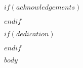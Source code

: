 \documentclass[oneside,11pt,a4paper] {report}
\begin{document}
$if(acknowledgements)$
  \renewcommand{\abstractname}{Acknowledgements}
  \ifdigital
  \fi
  \begin{abstract}
    \pagestyle{empty}
  $acknowledgements$
  \end{abstract}

  \newpage
  \thispagestyle{empty}
  \cleardoublepage
$endif$

$if(dedication)$
  \renewcommand{\abstractname}{dedication}
  \ifdigital
  \fi
  \begin{abstract}
    \pagestyle{empty}
  $dedication$
  \end{abstract}

  \newpage
  \thispagestyle{empty}
  \cleardoublepage
$endif$


\setcounter{page}{1} 

\tableofcontents

\cleardoublepage
\ifdigital
\fi
{}
\listoffigures

\cleardoublepage
\ifdigital
\fi
{}
\listoftables

\newpage

\setcounter{page}{1}

$body$



% 
% 
\end{document}
